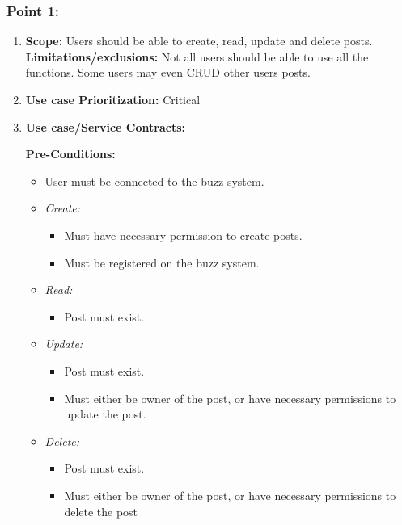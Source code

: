 \documentclass[11pt]{article}
\begin{document}
\subsubsection{Point 1:}
\begin{enumerate}
\item 
\textbf{Scope:}
Users should be able to create, read, update and delete posts.
\newline
\textbf{Limitations/exclusions:} Not all users should be able to use all the functions. Some users may even CRUD other users posts.

\item 
\textbf{Use case Prioritization:} Critical

\item 
\textbf{Use case/Service Contracts:} 

\textbf{Pre-Conditions: }
\begin{itemize}
\item User must be connected to the buzz system.

\item \textit{Create: }
	\begin{itemize}
    	\item Must have necessary permission to create posts.
    	\item Must be registered on the buzz system.
  	\end{itemize}

\item \textit{Read: }
	\begin{itemize}
	\item Post must exist.
	\end{itemize}
	
\item \textit{Update: }
	\begin{itemize}
	\item Post must exist.
	\item Must either be owner of the post, or have necessary 		permissions to update the post.
	\end{itemize}

\item \textit{Delete: }
	\begin{itemize}
	\item Post must exist.
	\item Must either be owner of the post, or have necessary permissions to delete the post
	\end{itemize}
\end{itemize}
 


\end{enumerate}
\end{document}
